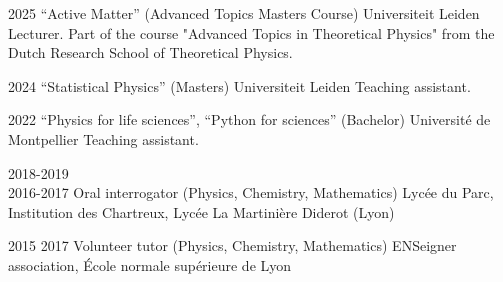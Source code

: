 \documentclass[a4paper]{cvtemplate_en} %
\begin{document}
\begin{cvbody}

\cvitem
	{2025}
	{}
	{``Active Matter'' (Advanced Topics Masters Course)}
	{Universiteit Leiden }
	{}{}{}
	{}
	{Lecturer. Part of the course "Advanced Topics in Theoretical Physics" from the Dutch Research School of Theoretical Physics.\vspace{5pt}}

\cvitem
	{2024}
	{}
	{``Statistical Physics'' (Masters)}
	{Universiteit Leiden }
	{}{}{}
	{}
	{Teaching assistant.\vspace{5pt}}

\cvitem
	{2022}
	{}
	{``Physics for life sciences'', ``Python for sciences'' (Bachelor)}
	{Université de Montpellier }
	{}{}{}
    {}
	{Teaching assistant.\vspace{5pt}}

\cvitem
	{2018-2019\\ \mbox{}\hfill 2016-2017}
	{}
	{Oral interrogator (Physics, Chemistry, Mathematics)}
	{Lyc\'ee du Parc, Institution des Chartreux, Lyc\'ee La Martinière Diderot (Lyon) }
	{}{}{}
	{}
	{\vspace{5pt}
	}


\cvitem
	{2015}
	{2017}
	{Volunteer tutor (Physics, Chemistry, Mathematics)}
	{ENSeigner association, \'Ecole normale sup\'erieure de Lyon }
	{}{}{}
	{}
	{\vspace{5pt}
	}

\end{cvbody}
\end{document}
